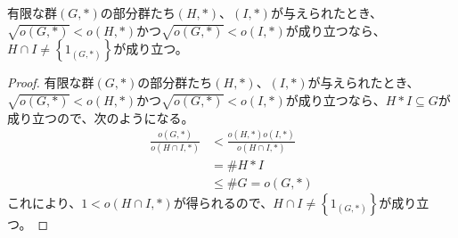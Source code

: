 \documentclass[dvipdfmx]{jsarticle}
\begin{document}
\begin{thm}\label{3.1.1.41}
有限な群$(G,*)$の部分群たち$(H,*)$、$(I,*)$が与えられたとき、$\sqrt{o(G,*)} < o(H,*)$かつ$\sqrt{o(G,*)} < o(I,*)$が成り立つなら、$H \cap I \neq \left\{ 1_{(G,*)} \right\}$が成り立つ。
\end{thm}
\begin{proof}
有限な群$(G,*)$の部分群たち$(H,*)$、$(I,*)$が与えられたとき、$\sqrt{o(G,*)} < o(H,*)$かつ$\sqrt{o(G,*)} < o(I,*)$が成り立つなら、$H*I \subseteq G$が成り立つので、次のようになる。
\begin{align*}
\frac{o(G,*)}{o(H \cap I,*)} &< \frac{o(H,*)o(I,*)}{o(H \cap I,*)}\\
&= \#{H*I}\\
&\leq \#G = o(G,*)
\end{align*}
これにより、$1 < o(H \cap I,*)$が得られるので、$H \cap I \neq \left\{ 1_{(G,*)} \right\}$が成り立つ。
\end{proof}
\end{document}
